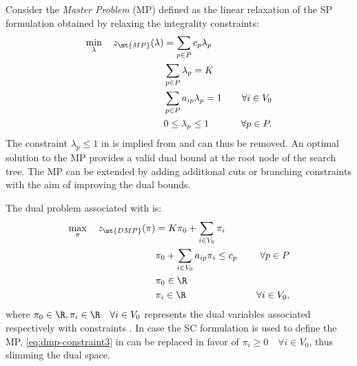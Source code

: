 Consider the \textit{Master Problem} (MP) defined
as the linear relaxation of the SP formulation
obtained by relaxing the integrality constraints:
\begin{align}
	\min_{\lambda} \quad z_\mt{MP}(\lambda) & = \sum_{p \in P}  c_p \lambda_p      & \label{eq:mp-obj-func}                                                                                                    \\
	                                        & \sum_{p \in P} \lambda_{p} = K       & \label{eq:mp-K-routes}                                                                                                    \\
	                                        & \sum_{p \in P}  a_{ip} \lambda_p = 1 & \quad \forall i \in V_0                                              \label{eq:mp-customers-visited-by-exactly-one-route} \\
	                                        & 0 \le \lambda_p \le 1                & \quad \forall p \in P \label{eq:mp-lambda-mip-var-bounds}.
\end{align}
The constraint $\lambda_p \le 1$ in 
is implied from  and can thus be removed.
An optimal solution to the MP provides a valid dual bound at the root node of the search tree.
The MP can be extended by adding additional cuts or branching constraints
with the aim of improving the dual bounds.

The dual problem associated with
is:
\begin{align}
	\max_{\pi} \quad z_\mt{DMP}(\pi) & =  K \pi_0 + \sum_{i \in V_0} \pi_i           & \label{eq:dmp-obj-func}                             \\
	                                 & \pi_0 + \sum_{i \in V_0} a_{ip} \pi_i \le c_p & \quad \forall p \in P \label{eq:dmp-constraint1}    \\
	                                 & \pi_0 \in \R                                  & \label{eq:dmp-constraint2}                          \\
	                                 & \pi_i \in \R                                  & \quad \forall i \in V_0 \label{eq:dmp-constraint3},
\end{align}
where $\pi_0 \in \R, \pi_i \in \R \quad \forall i \in V_0$ represents the dual variables
associated respectively with constraints .
In case the SC formulation
is used to define the MP,
\cref{eq:dmp-constraint3} in
can be replaced in favor of $\pi_i \ge 0 \quad \forall i \in V_0$,
thus slimming the dual space.

